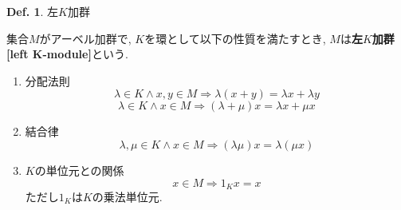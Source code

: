 \documentclass[a4paper,10pt,report]{amsart}
\theoremstyle{plain}
\theoremstyle{definition}
\newtheorem{defn}{Def.}[section]
\theoremstyle{remark}
\begin{document}
\begin{leftbar}
    \begin{defn}左\(K\)加群\par
        集合\(M\)がアーベル加群で, \(K\)を環として以下の性質を満たすとき, 
        \(M\)は\textbf{左\(K\)加群[left K-module]}という. 
        \begin{enumerate}
            \item 分配法則
            \begin{equation*}
                \lambda \in K\wedge x, y\in M\Rightarrow \lambda(x+y)=\lambda x+\lambda y
            \end{equation*}
            \begin{equation*}
                \lambda \in K\wedge x\in M\Rightarrow (\lambda+\mu)x=\lambda x+\mu x
            \end{equation*}
            \item 結合律
            \begin{equation*}
                \lambda,\mu \in K\wedge x\in M\Rightarrow (\lambda\mu) x=\lambda(\mu x)
            \end{equation*}
            \item \(K\)の単位元との関係
            \begin{equation*}
                x\in M\Rightarrow1_{K}x=x
            \end{equation*}
            ただし\(1_{K}\)は\(K\)の乗法単位元. 
        \end{enumerate}
    \end{defn}
\end{leftbar}
\end{document}
